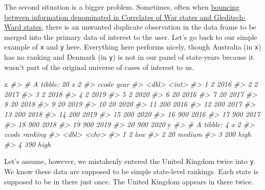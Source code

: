 \documentclass[
  11pt,
]{article}
\newenvironment{Shaded}{\begin{snugshade}}{\end{snugshade}}
\newcommand{\CommentTok}[1]{\textcolor[rgb]{0.56,0.35,0.01}{\textit{#1}}}
\newcommand{\NormalTok}[1]{#1}
\begin{document}
The second situation is a bigger problem. Sometimes, often when \href{http://svmiller.com/peacesciencer/articles/state-systems.html}{bouncing between information denominated in Correlates of War states and Gleditsch-Ward states}, there is an unwanted duplicate observation in the data frame to be merged into the primary data of interest to the user. Let's go back to our simple example of \texttt{x} and \texttt{y} here. Everything here performs nicely, though Australia (in \texttt{x}) has no ranking and Denmark (in \texttt{y}) is not in our panel of state-years because it wasn't part of the original universe of cases of interest to us.

\begin{Shaded}
\begin{Highlighting}[]
\NormalTok{x}
\CommentTok{\#\textgreater{} \# A tibble: 20 x 2}
\CommentTok{\#\textgreater{}    ccode  year}
\CommentTok{\#\textgreater{}    \textless{}dbl\textgreater{} \textless{}int\textgreater{}}
\CommentTok{\#\textgreater{}  1     2  2016}
\CommentTok{\#\textgreater{}  2     2  2017}
\CommentTok{\#\textgreater{}  3     2  2018}
\CommentTok{\#\textgreater{}  4     2  2019}
\CommentTok{\#\textgreater{}  5     2  2020}
\CommentTok{\#\textgreater{}  6    20  2016}
\CommentTok{\#\textgreater{}  7    20  2017}
\CommentTok{\#\textgreater{}  8    20  2018}
\CommentTok{\#\textgreater{}  9    20  2019}
\CommentTok{\#\textgreater{} 10    20  2020}
\CommentTok{\#\textgreater{} 11   200  2016}
\CommentTok{\#\textgreater{} 12   200  2017}
\CommentTok{\#\textgreater{} 13   200  2018}
\CommentTok{\#\textgreater{} 14   200  2019}
\CommentTok{\#\textgreater{} 15   200  2020}
\CommentTok{\#\textgreater{} 16   900  2016}
\CommentTok{\#\textgreater{} 17   900  2017}
\CommentTok{\#\textgreater{} 18   900  2018}
\CommentTok{\#\textgreater{} 19   900  2019}
\CommentTok{\#\textgreater{} 20   900  2020}
\NormalTok{y}
\CommentTok{\#\textgreater{} \# A tibble: 4 x 2}
\CommentTok{\#\textgreater{}   ccode ranking}
\CommentTok{\#\textgreater{}   \textless{}dbl\textgreater{} \textless{}chr\textgreater{}  }
\CommentTok{\#\textgreater{} 1     2 low    }
\CommentTok{\#\textgreater{} 2    20 medium }
\CommentTok{\#\textgreater{} 3   200 high   }
\CommentTok{\#\textgreater{} 4   390 high}
\end{Highlighting}
\end{Shaded}

Let's assume, however, we mistakenly entered the United Kingdom twice into \texttt{y}. We know these data are supposed to be simple state-level rankings. Each state is supposed to be in there just once. The United Kingdom appears in there twice.
\end{document}

